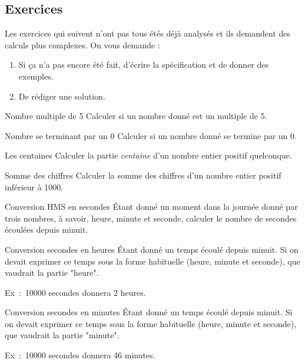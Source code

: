 		\subsection{Exercices}
		\label{prem-ex-cplx}
		
			Les exercices qui suivent n'ont pas tous étés déjà analysés
			et ils demandent des calculs plus complexes.
			On vous demande :
			\begin{enumerate}
			\item
				Si ça n'a pas encore été fait,
				d'écrire la spécification et de donner des exemples.
			\item
				De rédiger une solution.
			\end{enumerate}
		
			\begin{Exercice}{Nombre multiple de 5}
				Calculer si un nombre donné est un multiple de 5.
			\end{Exercice}
		
			\begin{Exercice}{Nombre se terminant par un 0}
				Calculer si un nombre donné se termine par un 0.
			\end{Exercice}
	
			\begin{Exercice}{Les centaines}
				Calculer la partie \emph{centaine}
				d'un nombre entier positif quelconque.
			\end{Exercice}
	
			\begin{Exercice}{Somme des chiffres}
				Calculer la somme des chiffres
				d’un nombre entier positif inférieur à 1000.
			\end{Exercice}
		
			\begin{Exercice}{Conversion HMS en secondes}
				Étant donné un moment dans la journée donné
				par trois nombres, à savoir, heure, minute et seconde, calculer le
				nombre de secondes écoulées depuis minuit.
			\end{Exercice}
		
			\begin{Exercice}{Conversion secondes en heures}
				Étant donné un temps écoulé depuis minuit.
				Si on devait exprimer ce temps sous la forme
				habituelle (heure, minute et seconde),
				que vaudrait la partie "heure".
		
				Ex~:~10000 secondes donnera 2 heures.
			\end{Exercice}
		
			\begin{Exercice}{Conversion secondes en minutes}
				Étant donné un temps écoulé depuis minuit.
				Si on devait exprimer ce temps sous la forme
				habituelle (heure, minute et seconde),
				que vaudrait la partie "minute".
		
				Ex~:~10000 secondes donnera 46 minutes.
			\end{Exercice}
		
